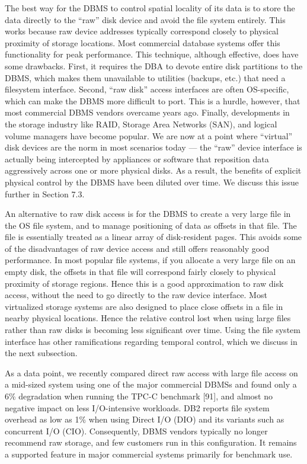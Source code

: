 \documentclass[b5paper,11pt,twoside,openright]{book}
\begin{document}
The best way for the DBMS to control spatial locality of its data is to
store the data directly to the ``raw'' disk device and avoid the file
system entirely. This works because raw device addresses typically
correspond closely to physical proximity of storage locations. Most
commercial database systems offer this functionality for peak
performance. This technique, although effective, does have some
drawbacks. First, it requires the DBA to devote entire disk partitions
to the DBMS, which makes them unavailable to utilities (backups, etc.)
that need a filesystem interface. Second, ``raw disk'' access interfaces
are often OS-specific, which can make the DBMS more difficult to port.
This is a hurdle, however, that most commercial DBMS vendors overcame
years ago. Finally, developments in the storage industry like RAID,
Storage Area Networks (SAN), and logical volume managers have become
popular. We are now at a point where ``virtual'' disk devices are the
norm in most scenarios today --- the ``raw'' device interface is
actually being intercepted by appliances or software that reposition
data aggressively across one or more physical disks. As a result, the
benefits of explicit physical control by the DBMS have been diluted over
time. We discuss this issue further in Section 7.3.

An alternative to raw disk access is for the DBMS to create a very large
file in the OS file system, and to manage positioning of data as offsets
in that file. The file is essentially treated as a linear array of
disk-resident pages. This avoids some of the disadvantages of raw device
access and still offers reasonably good performance. In most popular
file systems, if you allocate a very large file on an empty disk, the
offsets in that file will correspond fairly closely to physical
proximity of storage regions. Hence this is a good approximation to raw
disk access, without the need to go directly to the raw device
interface. Most virtualized storage systems are also designed to place
close offsets in a file in nearby physical locations. Hence the relative
control lost when using large files rather than raw disks is becoming
less significant over time. Using the file system interface has other
ramifications regarding temporal control, which we discuss in the next
subsection.

As a data point, we recently compared direct raw access with large file
access on a mid-sized system using one of the major commercial DBMSs and
found only a 6\% degradation when running the TPC-C benchmark {[}91{]},
and almost no negative impact on less I/O-intensive workloads. DB2
reports file system overhead as low as 1\% when using Direct I/O (DIO)
and its variants such as concurrent I/O (CIO). Consequently, DBMS
vendors typically no longer recommend raw storage, and few customers run
in this configuration. It remains a supported feature in major
commercial systems primarily for benchmark use.
\end{document}

